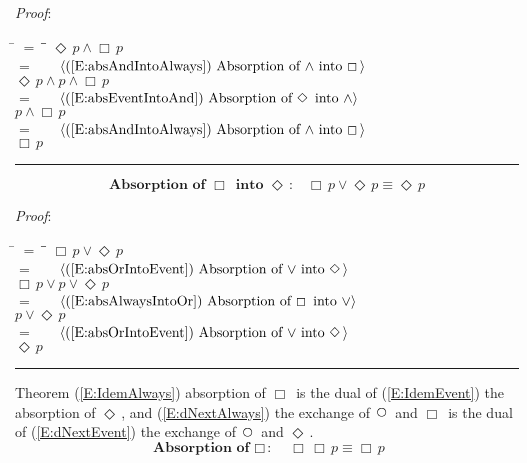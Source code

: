 \documentclass[12pt, fleqn, leqno]{article}
\newcommand{\lgap}{2pt}                             %
\newcommand{\mymathindent}{24pt}                    %
\newcommand{\Next}{\;\,\text{\raisebox{3.5pt}{\circle{6}}}}
\newcommand{\Event}{\Diamond\,}
\newcommand{\Always}{\Box\,}
\newcommand{\myqed}{\rule[-.23ex]{1.2ex}{2.0ex}}
\newcommand{\myqedtab}{\hspace{384pt}}              %
\newcommand{\Gll} {\langle}                         %
\newcommand{\Ggg} {\rangle}                         %
\newcommand{\Hint}[1]     {\ \ \ $\Gll              \mbox{#1} \Ggg$ }   %
\begin{document}
\emph{Proof}:
\begin{tabbing}
\hspace{\mymathindent} \= $= \;$ \= \myqedtab \= \kill
  \> \>   $\Event p \land \Always p$\\[\lgap]
  \> $=$  \>  \Hint{(\ref{E:absAndIntoAlways}) Absorption of $\land$ into $\Always$}\\[\lgap]
  \> \>   $\Event p \land p \land \Always p$\\[\lgap]
  \> $=$  \>  \Hint{(\ref{E:absEventIntoAnd}) Absorption of $\Event$ into $\land$}\\[\lgap]
  \> \>   $p \land \Always p$\\[\lgap]
  \> $=$  \>  \Hint{(\ref{E:absAndIntoAlways}) Absorption of $\land$ into $\Always$}\\[\lgap]
  \> \>   $\Always p$ \quad \myqed
\end{tabbing}
\begin{equation}\label{E:absAlwaysIntoEvent}
\textbf{Absorption of $\Always$ into $\Event$:}\quad \Always p \lor \Event p \equiv \Event p
\end{equation}

\emph{Proof}:
\begin{tabbing}
\hspace{\mymathindent} \= $= \;$ \= \myqedtab \= \kill
  \> \>   $\Always p \lor \Event p$\\[\lgap]
  \> $=$  \>  \Hint{(\ref{E:absOrIntoEvent}) Absorption of $\lor$ into $\Event$}\\[\lgap]
  \> \>   $\Always p \lor p \lor \Event p$\\[\lgap]
  \> $=$  \>  \Hint{(\ref{E:absAlwaysIntoOr}) Absorption of $\Always$ into $\lor$}\\[\lgap]
  \> \>   $ p \lor \Event p$\\[\lgap]
  \> $=$  \>  \Hint{(\ref{E:absOrIntoEvent}) Absorption of $\lor$ into $\Event$}\\[\lgap]
  \> \>   $\Event p$ \quad \myqed
\end{tabbing}

Theorem (\ref{E:IdemAlways}) absorption of $\Always$ is the dual of (\ref{E:IdemEvent}) the absorption of $\Event$,
and (\ref{E:dNextAlways}) the exchange of $\Next$ and $\Always$ is the dual of
(\ref{E:dNextEvent}) the exchange of $\Next$ and $\Event$.
\begin{equation}\label{E:IdemAlways}
\textbf{Absorption of $\Always$:}\quad \Always\Always p \equiv \Always p
\end{equation}
\end{document}
